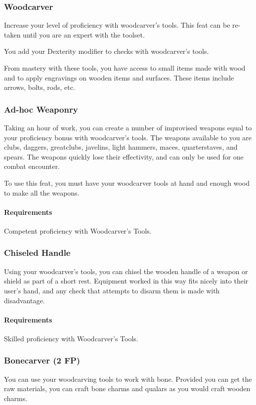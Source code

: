 \subsubsection{Woodcarver} \label{feat::woodcarver}
    Increase your level of proficiency with woodcarver's tools.
    This feat can be re-taken until you are an expert with the toolset.

    You add your Dexterity modifier to checks with woodcarver's tools.

    From mastery with these tools, you have access to small items made with wood and to apply engravings on wooden items and surfaces.
    These items include arrows, bolts, rods, etc.
\subsubsection{Ad-hoc Weaponry} \label{feat::adhocweaponry}
    Taking an hour of work, you can create a number of improvised weapons equal to your proficiency bonus with woodcarver's tools.
    The weapons available to you are clubs, daggers, greatclubs, javelins, light hammers, maces, quarterstaves, and spears.
    The weapons quickly lose their effectivity, and can only be used for one combat encounter.

    To use this feat, you must have your woodcarver tools at hand and enough wood to make all the weapons.
    \paragraph{Requirements} Competent proficiency with Woodcarver's Tools.
\subsubsection{Chiseled Handle} \label{feat::chiseledhandle}
    Using your woodcarver's tools, you can chisel the wooden handle of a weapon or shield as part of a short rest.
    Equipment worked in this way fits nicely into their user's hand, and any check that attempts to disarm them is made with disadvantage.
    \paragraph{Requirements} Skilled proficiency with Woodcarver's Tools.
\subsubsection{Bonecarver (2 FP)} \label{feat::bonecarver}
    You can use your woodcarving tools to work with bone.
    Provided you can get the raw materials, you can craft bone charms and qualars as you would craft wooden charms.
